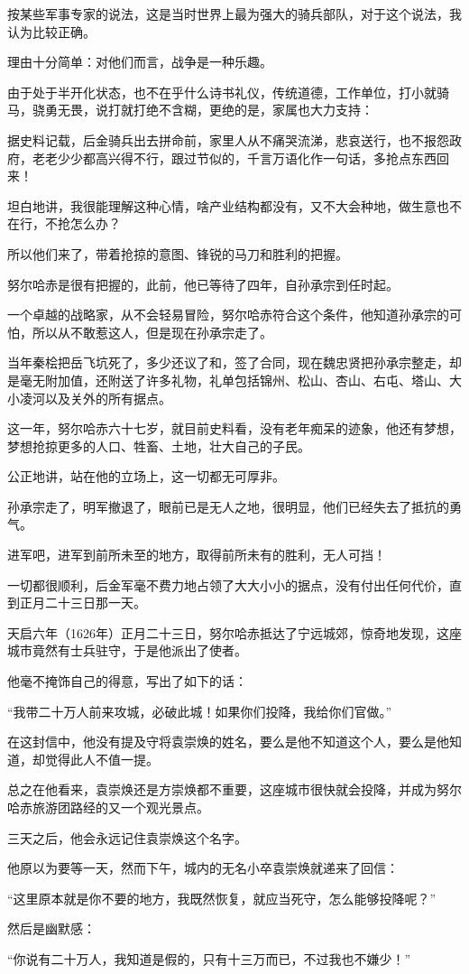 \begin{multicols}{\theparacolNo}
		按某些军事专家的说法，这是当时世界上最为强大的骑兵部队，对于这个说法，我认为比较正确。

		理由十分简单：对他们而言，战争是一种乐趣。

		由于处于半开化状态，也不在乎什么诗书礼仪，传统道德，工作单位，打小就骑马，骁勇无畏，说打就打绝不含糊，更绝的是，家属也大力支持：

		据史料记载，后金骑兵出去拼命前，家里人从不痛哭流涕，悲哀送行，也不报怨政府，老老少少都高兴得不行，跟过节似的，千言万语化作一句话，多抢点东西回来！

		坦白地讲，我很能理解这种心情，啥产业结构都没有，又不大会种地，做生意也不在行，不抢怎么办？

		所以他们来了，带着抢掠的意图、锋锐的马刀和胜利的把握。

		努尔哈赤是很有把握的，此前，他已等待了四年，自孙承宗到任时起。

		一个卓越的战略家，从不会轻易冒险，努尔哈赤符合这个条件，他知道孙承宗的可怕，所以从不敢惹这人，但是现在孙承宗走了。

		当年秦桧把岳飞坑死了，多少还议了和，签了合同，现在魏忠贤把孙承宗整走，却是毫无附加值，还附送了许多礼物，礼单包括锦州、松山、杏山、右屯、塔山、大小凌河以及关外的所有据点。

		这一年，努尔哈赤六十七岁，就目前史料看，没有老年痴呆的迹象，他还有梦想，梦想抢掠更多的人口、牲畜、土地，壮大自己的子民。

		公正地讲，站在他的立场上，这一切都无可厚非。

		孙承宗走了，明军撤退了，眼前已是无人之地，很明显，他们已经失去了抵抗的勇气。

		进军吧，进军到前所未至的地方，取得前所未有的胜利，无人可挡！

		一切都很顺利，后金军毫不费力地占领了大大小小的据点，没有付出任何代价，直到正月二十三日那一天。

		天启六年（1626年）正月二十三日，努尔哈赤抵达了宁远城郊，惊奇地发现，这座城市竟然有士兵驻守，于是他派出了使者。

		他毫不掩饰自己的得意，写出了如下的话：

		“我带二十万人前来攻城，必破此城！如果你们投降，我给你们官做。”

		在这封信中，他没有提及守将袁崇焕的姓名，要么是他不知道这个人，要么是他知道，却觉得此人不值一提。

		总之在他看来，袁崇焕还是方崇焕都不重要，这座城市很快就会投降，并成为努尔哈赤旅游团路经的又一个观光景点。

		三天之后，他会永远记住袁崇焕这个名字。

		他原以为要等一天，然而下午，城内的无名小卒袁崇焕就递来了回信：

		“这里原本就是你不要的地方，我既然恢复，就应当死守，怎么能够投降呢？”

		然后是幽默感：

		“你说有二十万人，我知道是假的，只有十三万而已，不过我也不嫌少！”

		\ifnum{}
	\end{multicols}
\fi
\newpage
